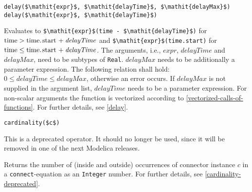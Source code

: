 \begin{operatordefinition}[delay]
\begin{synopsis}\begin{lstlisting}
delay($\mathit{expr}$, $\mathit{delayTime}$, $\mathit{delayMax}$)
delay($\mathit{expr}$, $\mathit{delayTime}$)
\end{lstlisting}\end{synopsis}
\begin{semantics}
Evaluates to \lstinline!$\mathit{expr}$(time - $\mathit{delayTime}$)! for $\text{\lstinline!time!} > \text{\lstinline!time.start!} + \mathit{delayTime}$ and \lstinline!$\mathit{expr}$(time.start)! for $\text{\lstinline!time!} \leq \text{\lstinline!time.start!} + \mathit{delayTime}$.
The arguments, i.e., $\mathit{expr}$, $\mathit{delayTime}$ and $\mathit{delayMax}$, need to be subtypes of \lstinline!Real!.
$\mathit{delayMax}$ needs to be additionally a parameter expression.
The following relation shall hold: $0 \leq \mathit{delayTime} \leq \mathit{delayMax}$, otherwise an error occurs.
If $\mathit{delayMax}$ is not supplied in the argument list, $\mathit{delayTime}$ needs to be a parameter expression.
For non-scalar arguments the function is vectorized according to \cref{vectorized-calls-of-functions}.
For further details, see \cref{delay}.
\end{semantics}
\end{operatordefinition}

\begin{operatordefinition}[cardinality]
\begin{synopsis}\begin{lstlisting}
cardinality($c$)
\end{lstlisting}\end{synopsis}
\begin{semantics}
\begin{nonnormative}
This is a deprecated operator.
It should no longer be used, since it will be removed in one of the next Modelica releases.
\end{nonnormative}
Returns the number of (inside and outside) occurrences of connector instance $c$ in a \lstinline!connect!-equation as an \lstinline!Integer! number.
For further details, see \cref{cardinality-deprecated}.
\end{semantics}
\end{operatordefinition}

